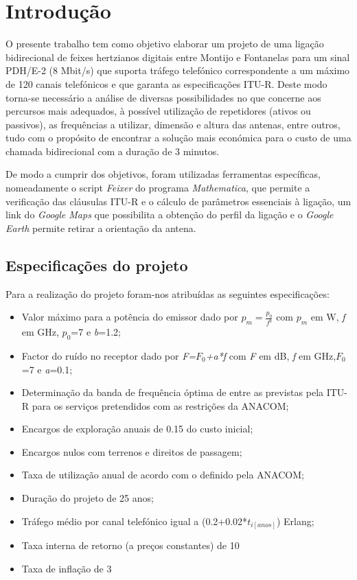 \section{Introdução}
O presente trabalho tem como objetivo elaborar um projeto de uma ligação bidirecional de feixes hertzianos digitais entre Montijo e Fontanelas para um sinal PDH/E-2 (8 Mbit/s) que suporta tráfego telefónico correspondente a um máximo de 120 canais telefónicos e que garanta as especificações ITU-R. Deste modo torna-se necessário a análise de diversas possibilidades no que concerne aos percursos mais adequados, à possível utilização de repetidores (ativos ou passivos), as frequências a utilizar, dimensão e altura das antenas, entre outros, tudo com o propósito de encontrar a solução mais económica para o custo de uma chamada bidirecional com a duração de 3 minutos.

De modo a cumprir dos objetivos, foram utilizadas ferramentas específicas, nomeadamente o script \textit{Feixer} do programa \textit{Mathematica}, que permite a verificação das cláusulas ITU-R e o cálculo de parâmetros essenciais à ligação, um link do \textit{Google Maps} que possibilita a obtenção do perfil da ligação e o \textit{Google Earth} permite retirar a orientação da antena.

\subsection{Especificações do projeto}
Para a realização do projeto foram-nos atribuídas as seguintes especificações:
\begin{itemize}
\item Valor máximo para a potência do emissor dado por \textit{$p_{m}=\frac{p_{0}}{f^b}$} com \textit{$p_{m}$} em W, \textit{f} em GHz, \textit{$p_{0}$}=7 e \textit{b}=1.2;
\item Factor do ruído no receptor dado por \textit{F=$F_{0}$+a*f} com \textit{F} em dB, \textit{f} em GHz,\textit{$F_{0}$}=7 e \textit{a}=0.1;
\item Determinação da banda de frequência óptima de entre as previstas pela ITU-R para os serviços pretendidos com as restrições da ANACOM;
\item Encargos de exploração anuais de 0.15 do custo inicial;
\item Encargos nulos com terrenos e direitos de passagem;
\item Taxa de utilização anual de acordo com o definido pela ANACOM;
\item Duração do projeto de 25 anos;
\item Tráfego médio por canal telefónico igual a (0.2+0.02*$t_{i[anos]}$) Erlang;
\item Taxa interna de retorno (a preços constantes) de 10%
\item Taxa de inflação de 3%
\end{itemize}


